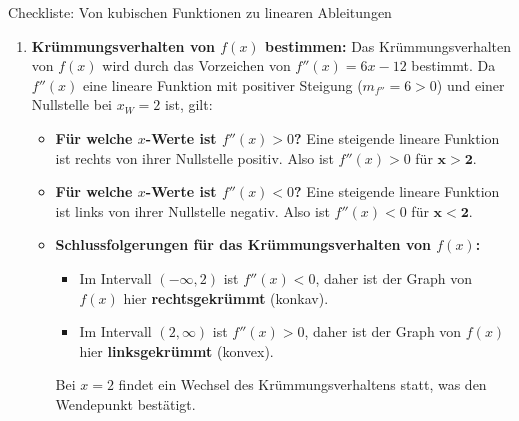 \begin{loesungsumgebung}{Checkliste: Von kubischen Funktionen zu linearen Ableitungen}
\begin{enumerate}[label=(\alph*)]
    \item \textbf{Krümmungsverhalten von $f(x)$ bestimmen:}
    Das Krümmungsverhalten von $f(x)$ wird durch das Vorzeichen von $f''(x) = 6x - 12$ bestimmt.
    Da $f''(x)$ eine lineare Funktion mit positiver Steigung ($m_{f''} = 6 > 0$) und einer Nullstelle bei $x_W=2$ ist, gilt:
    \begin{itemize}
        \item \textbf{Für welche $x$-Werte ist $f''(x) > 0$?}
        Eine steigende lineare Funktion ist rechts von ihrer Nullstelle positiv.
        Also ist $f''(x) > 0$ für $\mathbf{x > 2}$.
        \item \textbf{Für welche $x$-Werte ist $f''(x) < 0$?}
        Eine steigende lineare Funktion ist links von ihrer Nullstelle negativ.
        Also ist $f''(x) < 0$ für $\mathbf{x < 2}$.
        \item \textbf{Schlussfolgerungen für das Krümmungsverhalten von $f(x)$:}
        \begin{itemize}
            \item Im Intervall $(-\infty, 2)$ ist $f''(x) < 0$, daher ist der Graph von $f(x)$ hier \textbf{rechtsgekrümmt} (konkav).
            \item Im Intervall $(2, \infty)$ ist $f''(x) > 0$, daher ist der Graph von $f(x)$ hier \textbf{linksgekrümmt} (konvex).
        \end{itemize}
        Bei $x=2$ findet ein Wechsel des Krümmungsverhaltens statt, was den Wendepunkt bestätigt.
    \end{itemize}


\end{enumerate}
\end{loesungsumgebung}
